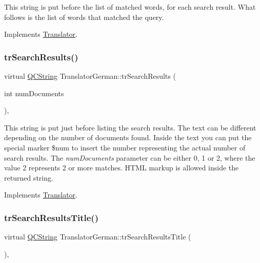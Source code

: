 This string is put before the list of matched words, for each search result. What follows is the list of words that matched the query. 

Implements \mbox{\hyperlink{class_translator}{Translator}}.

\mbox{\label{class_translator_german_a81362c1a5030471cd88a69d979220ef7}} 
\subsubsection{\texorpdfstring{trSearchResults()}{trSearchResults()}}
{\footnotesize\ttfamily virtual \mbox{\hyperlink{class_q_c_string}{Q\+C\+String}} Translator\+German\+::tr\+Search\+Results (\begin{DoxyParamCaption}\item[{int}]{num\+Documents }\end{DoxyParamCaption})\hspace{0.3cm}{\ttfamily [inline]}, {\ttfamily [virtual]}}

This string is put just before listing the search results. The text can be different depending on the number of documents found. Inside the text you can put the special marker \$num to insert the number representing the actual number of search results. The {\itshape num\+Documents} parameter can be either 0, 1 or 2, where the value 2 represents 2 or more matches. H\+T\+ML markup is allowed inside the returned string. 

Implements \mbox{\hyperlink{class_translator}{Translator}}.

\mbox{\label{class_translator_german_abb5abfea8029a74219e3db370bf1e99e}} 
\subsubsection{\texorpdfstring{trSearchResultsTitle()}{trSearchResultsTitle()}}
{\footnotesize\ttfamily virtual \mbox{\hyperlink{class_q_c_string}{Q\+C\+String}} Translator\+German\+::tr\+Search\+Results\+Title (\begin{DoxyParamCaption}{ }\end{DoxyParamCaption})\hspace{0.3cm}{\ttfamily [inline]}, {\ttfamily [virtual]}}

